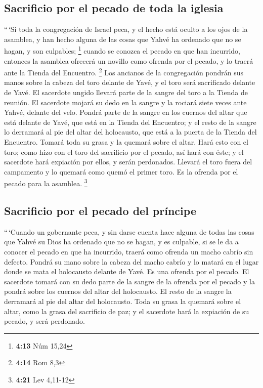 \begin{paracol}{2}
\hypertarget{sacrificio-por-el-pecado-de-toda-la-iglesia}{%
\subsection{Sacrificio por el pecado de toda la
iglesia}\label{sacrificio-por-el-pecado-de-toda-la-iglesia}}

 ``\,`Si toda la congregación de Israel peca, y el hecho
está oculto a los ojos de la asamblea, y han hecho alguna de las cosas
que Yahvé ha ordenado que no se hagan, y son culpables; \footnote{\textbf{4:13}
  Núm 15,24}  cuando se conozca el pecado en que han
incurrido, entonces la asamblea ofrecerá un novillo como ofrenda por el
pecado, y lo traerá ante la Tienda del Encuentro. \footnote{\textbf{4:14}
  Rom 8,3}  Los ancianos de la congregación pondrán sus
manos sobre la cabeza del toro delante de Yavé, y el toro será
sacrificado delante de Yavé.  El sacerdote ungido llevará
parte de la sangre del toro a la Tienda de reunión.  El
sacerdote mojará su dedo en la sangre y la rociará siete veces ante
Yahvé, delante del velo.  Pondrá parte de la sangre en
los cuernos del altar que está delante de Yavé, que está en la Tienda
del Encuentro; y el resto de la sangre lo derramará al pie del altar del
holocausto, que está a la puerta de la Tienda del Encuentro.
 Tomará toda su grasa y la quemará sobre el altar.
 Hará esto con el toro; como hizo con el toro del
sacrificio por el pecado, así hará con éste; y el sacerdote hará
expiación por ellos, y serán perdonados.  Llevará el toro
fuera del campamento y lo quemará como quemó el primer toro. Es la
ofrenda por el pecado para la asamblea. \footnote{\textbf{4:21} Lev
  4,11-12}

\hypertarget{sacrificio-por-el-pecado-del-pruxedncipe}{%
\subsection{Sacrificio por el pecado del
príncipe}\label{sacrificio-por-el-pecado-del-pruxedncipe}}

 ``\,`Cuando un gobernante peca, y sin darse cuenta hace
alguna de todas las cosas que Yahvé su Dios ha ordenado que no se hagan,
y es culpable,  si se le da a conocer el pecado en que ha
incurrido, traerá como ofrenda un macho cabrío sin defecto.
 Pondrá su mano sobre la cabeza del macho cabrío y lo
matará en el lugar donde se mata el holocausto delante de Yavé. Es una
ofrenda por el pecado.  El sacerdote tomará con su dedo
parte de la sangre de la ofrenda por el pecado y la pondrá sobre los
cuernos del altar del holocausto. El resto de la sangre la derramará al
pie del altar del holocausto.  Toda su grasa la quemará
sobre el altar, como la grasa del sacrificio de paz; y el sacerdote hará
la expiación de su pecado, y será perdonado.


\end{paracol}
